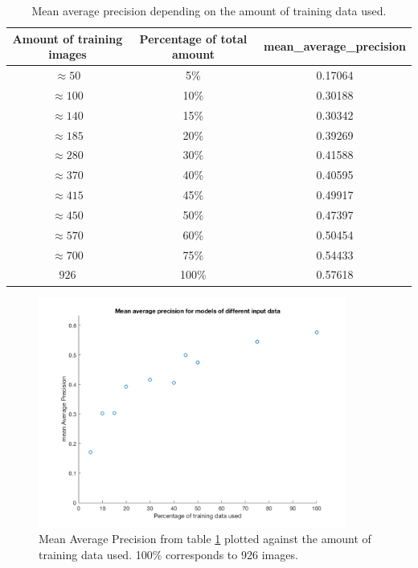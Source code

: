 \begin{table}[h]
\centering
\begin{tabular}{ |c|c|c| } 
 \hline
 Amount of training images & Percentage of total amount & mean\_average\_precision  \\ 
 \hline
 $\approx 50$& 5\% & 0.17064 \\
 \hline
 $\approx 100$& 10\% & 0.30188 \\
\hline
  $\approx 140$& 15\% &  0.30342 \\
 \hline
 $\approx 185$& 20\% & 0.39269 \\
 \hline
$\approx 280$ &  30\% & 0.41588 \\
 \hline
 $\approx 370$& 40\% & 0.40595 \\
 \hline
 $\approx 415$& 45\% & 0.49917 \\
 \hline
 $\approx 450$& 50\% & 0.47397 \\
\hline
$\approx 570$ & 60\% & 0.50454 \\
\hline
 $\approx 700$& 75\% & 0.54433 \\
 \hline
$926$ & 100\% & 0.57618 \\
 \hline
\end{tabular}
\caption{Mean average precision depending on the amount of training data used.}
\label{table:mAP}
\end{table}

\begin{figure}[h]
\begin{center}
\includegraphics[width = 0.9\textwidth]{./Images/mapPlot.png}
\caption{Mean Average Precision from table \ref{table:mAP} plotted against the amount of training data used. 100\% corresponds to 926 images.}
\label{fig:mAPResult}
\end{center}
\end{figure}

